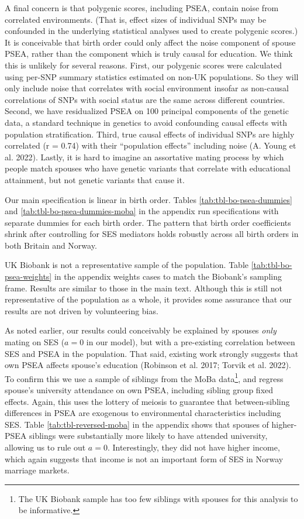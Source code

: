 \documentclass[
  12pt,
]{article}
\theoremstyle{definition}
\theoremstyle{definition}
\theoremstyle{definition}
\theoremstyle{definition}
\theoremstyle{remark}
\begin{document}
A final concern is that polygenic scores, including PSEA, contain noise from
correlated environments. (That is, effect sizes of individual SNPs may be
confounded in the underlying statistical analyses used to create polygenic
scores.) It is conceivable that birth order could only affect the noise
component of spouse PSEA, rather than the component which is truly causal for
education. We think this is unlikely for several reasons. First, our polygenic
scores were calculated using per-SNP summary statistics estimated on non-UK
populations. So they will only include noise that correlates with social
environment insofar as non-causal correlations of SNPs with social status
are the same across different countries.
Second, we have residualized PSEA on 100 principal components of the genetic
data, a standard technique in genetics to avoid confounding causal effects with
population stratification. Third, true causal effects of individual
SNPs are highly correlated (r = 0.74) with their ``population effects''
including noise (A. Young et al. 2022). Lastly, it is hard to imagine an
assortative mating process by which people match spouses who have genetic
variants that correlate with educational attainment, but not genetic variants
that cause it.

Our main specification is linear in birth order. Tables
\ref{tab:tbl-bo-psea-dummies} and \ref{tab:tbl-bo-psea-dummies-moba} in the
appendix run specifications with separate dummies for each birth order. The
pattern that birth order coefficients shrink after controlling for SES mediators
holds robustly across all birth orders in both Britain and Norway.

UK Biobank is not a representative sample of the population. Table
\ref{tab:tbl-bo-psea-weights} in the appendix weights cases to match the
Biobank's sampling frame. Results are similar to those in the main text.
Although this is still not representative of the population as a whole, it
provides some assurance that our results are not driven by volunteering bias.

As noted earlier, our results could conceivably be explained by spouses \emph{only}
mating on SES (\(a = 0\) in our model), but with a pre-existing correlation
between SES and PSEA in the population. That said, existing work strongly
suggests that own PSEA affects spouse's education (Robinson et al. 2017; Torvik et al. 2022). To confirm this we use a sample of siblings from the MoBa
data\footnote{The UK Biobank sample has too few siblings with spouses for
  this analysis to be informative.}, and regress spouse's university attendance on own PSEA,
including sibling group fixed effects. Again, this uses the lottery of meiosis
to guarantee that between-sibling differences in PSEA are exogenous to
environmental characteristics including SES. Table \ref{tab:tbl-reversed-moba}
in the appendix shows that spouses of higher-PSEA siblings were substantially
more likely to have attended university, allowing us to rule out \(a = 0\).
Interestingly, they did not have higher income, which again suggests that
income is not an important form of SES in Norway marriage markets.
\end{document}
